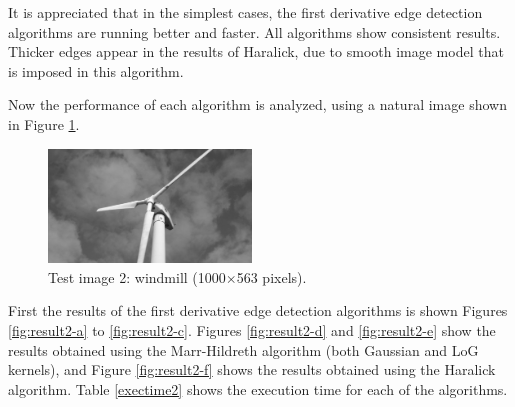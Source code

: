 \documentclass{ipol}
\numberwithin{equation}{section}
\numberwithin{table}{section}
\begin{document}
It is appreciated that in the simplest cases, the first derivative edge detection algorithms are running better and faster. All algorithms show consistent results. Thicker edges appear in the results of Haralick, due to smooth image model that is imposed in this algorithm. 

Now the performance of each algorithm is analyzed, using a natural image shown in Figure \ref{fig:original2}. 

\begin{figure}[t!]
	\centering
	\includegraphics[width=0.48\textwidth]{results/molino_bw.png}
	\caption{Test image 2: windmill (1000$\times$563 pixels).}
	\label{fig:original2}
\end{figure}

First the results of the first derivative edge detection algorithms is shown Figures \ref{fig:result2-a} to \ref{fig:result2-c}. Figures \ref{fig:result2-d} and \ref{fig:result2-e} show the results obtained using the Marr-Hildreth algorithm (both Gaussian and LoG kernels), and Figure \ref{fig:result2-f} shows the results obtained using the Haralick algorithm. Table \ref{exectime2} shows the execution time for each of the algorithms. 
\end{document}
